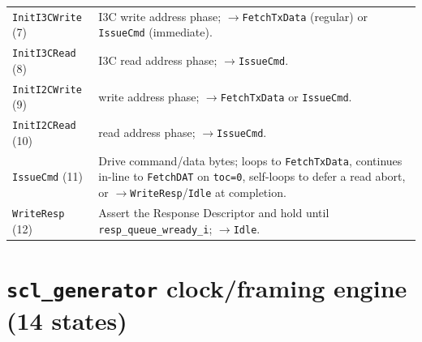 \begin{longtable}{@{}l>{\raggedright\arraybackslash}p{}@{}}
\texttt{InitI3CWrite} (7)      & I3C write address phase; $\to$\texttt{FetchTxData} (regular) or \texttt{IssueCmd} (immediate). \\
\texttt{InitI3CRead} (8)       & I3C read address phase; $\to$\texttt{IssueCmd}. \\
\texttt{InitI2CWrite} (9)      & \iic{} write address phase; $\to$\texttt{FetchTxData} or \texttt{IssueCmd}. \\
\texttt{InitI2CRead} (10)      & \iic{} read address phase; $\to$\texttt{IssueCmd}. \\
\texttt{IssueCmd} (11)         & Drive command/data bytes; loops to \texttt{FetchTxData}, continues in-line to \texttt{FetchDAT} on \texttt{toc=0}, self-loops to defer a read abort, or $\to$\texttt{WriteResp}/\texttt{Idle} at completion. \\
\texttt{WriteResp} (12)        & Assert the Response Descriptor and hold until \texttt{resp\_queue\_wready\_i}; $\to$\texttt{Idle}. \\
\end{longtable}

\section{\texttt{scl\_generator} clock/framing engine (14 states)}

